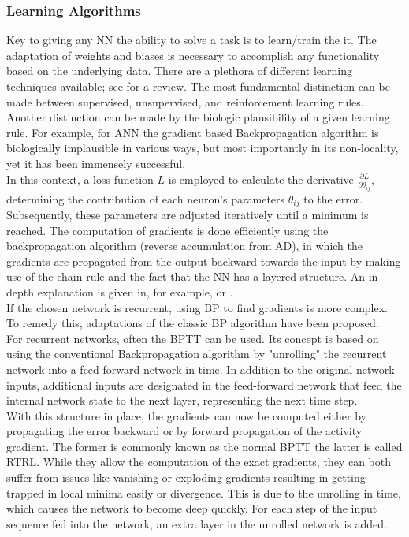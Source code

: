 \subsubsection{Learning Algorithms}
	Key to giving any \ac{NN} the ability to solve a task is to learn/train the it. The adaptation of weights and biases is necessary to accomplish any functionality based on the underlying data\cite{zheng_introductory_2022}. There are a plethora of different learning techniques available; see \cite{abdolrasol_artificial_2021,sun_survey_2019} for a review. The most fundamental distinction can be made between supervised, unsupervised, and reinforcement learning rules. Another distinction can be made by the biologic plausibility of a given learning rule. For example, for \ac{ANN} the gradient based Backpropagation algorithm is biologically implausible in various ways, but most importantly in its non-locality, yet it has been immensely successful.\\
	In this context, a loss function $L$ is employed to calculate the derivative $\frac{\partial L}{\partial \theta_{ij}}$, determining the contribution of each neuron's parameters $\theta_{ij}$ to the error. Subsequently, these parameters are adjusted iteratively until a minimum is reached. The computation of gradients is done efficiently using the backpropagation algorithm (reverse accumulation from \ac{AD}), in which the gradients are propagated from the output backward towards the input by making use of the chain rule and the fact that the \ac{NN} has a layered structure. An in-depth explanation is given in, for example, \cite{goodfellow_deep_2016} or \cite{nielsen_neural_2015}.\\
	If the chosen network is recurrent, using \ac{BP} to find gradients is more complex. To remedy this, adaptations of the classic \ac{BP} algorithm have been proposed.\\
	For recurrent networks, often the \ac{BPTT} can be used. Its concept is based on using the conventional Backpropagation algorithm by "unrolling" the recurrent network into a feed-forward network in time. In addition to the original network inputs, additional inputs are designated in the feed-forward network that feed the internal network state to the next layer, representing the next time step.\\
	With this structure in place, the gradients can now be computed either by propagating the error backward or by forward propagation of the activity gradient. The former is commonly known as the normal \ac{BPTT} the latter is called \ac{RTRL}\cite{williams_gradient-based_1995}. While they allow the computation of the exact gradients, they can both suffer from issues like vanishing or exploding gradients \cite{pascanu_difficulty_2013,bengio_learning_1994} resulting in getting trapped in local minima easily or divergence. This is due to the unrolling in time, which causes the network to become deep quickly. For each step of the input sequence fed into the network, an extra layer in the unrolled network is added.\\
